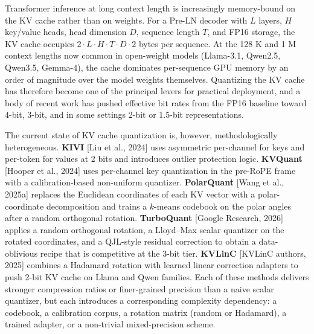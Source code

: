 Transformer inference at long context length is increasingly
memory-bound on the KV cache rather than on weights. For a Pre-LN
decoder with \(L\) layers, \(H\) key/value heads, head dimension \(D\),
sequence length \(T\), and FP16 storage, the KV cache occupies
\(2 \cdot L \cdot H \cdot T \cdot D \cdot 2\) bytes per sequence. At the
128 K and 1 M context lengths now common in open-weight models
(Llama-3.1, Qwen2.5, Qwen3.5, Gemma-4), the cache dominates per-sequence
GPU memory by an order of magnitude over the model weights themselves.
Quantizing the KV cache has therefore become one of the principal levers
for practical deployment, and a body of recent work has pushed effective
bit rates from the FP16 baseline toward 4-bit, 3-bit, and in some
settings 2-bit or 1.5-bit representations.

The current state of KV cache quantization is, however, methodologically
heterogeneous. \textbf{KIVI} {[}Liu et al., 2024{]} uses asymmetric
per-channel for keys and per-token for values at 2 bits and introduces
outlier protection logic. \textbf{KVQuant} {[}Hooper et al., 2024{]}
uses per-channel key quantization in the pre-RoPE frame with a
calibration-based non-uniform quantizer. \textbf{PolarQuant} {[}Wang et
al., 2025a{]} replaces the Euclidean coordinates of each KV vector with
a polar-coordinate decomposition and trains a \(k\)-means codebook on
the polar angles after a random orthogonal rotation. \textbf{TurboQuant}
{[}Google Research, 2026{]} applies a random orthogonal rotation, a
Lloyd--Max scalar quantizer on the rotated coordinates, and a QJL-style
residual correction to obtain a data-oblivious recipe that is
competitive at the 3-bit tier. \textbf{KVLinC} {[}KVLinC authors,
2025{]} combines a Hadamard rotation with learned linear correction
adapters to push 2-bit KV cache on Llama and Qwen families. Each of
these methods delivers stronger compression ratios or finer-grained
precision than a naive scalar quantizer, but each introduces a
corresponding complexity dependency: a codebook, a calibration corpus, a
rotation matrix (random or Hadamard), a trained adapter, or a
non-trivial mixed-precision scheme.

